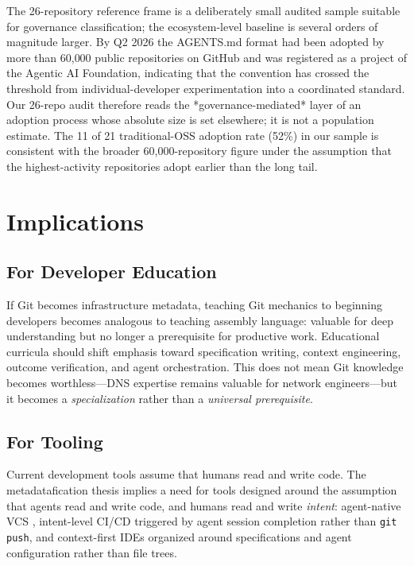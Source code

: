 \documentclass[12pt]{article}
\begin{document}
The 26-repository reference frame is a deliberately small audited sample suitable for governance classification; the ecosystem-level baseline is several orders of magnitude larger. By Q2 2026 the AGENTS.md format had been adopted by more than 60{,}000 public repositories on GitHub and was registered as a project of the Agentic AI Foundation, indicating that the convention has crossed the threshold from individual-developer experimentation into a coordinated standard. Our 26-repo audit therefore reads the *governance-mediated* layer of an adoption process whose absolute size is set elsewhere; it is not a population estimate. The 11 of 21 traditional-OSS adoption rate (52\%) in our sample is consistent with the broader 60{,}000-repository figure under the assumption that the highest-activity repositories adopt earlier than the long tail.

\section{Implications}

\subsection{For Developer Education}

If Git becomes infrastructure metadata, teaching Git mechanics to beginning developers becomes analogous to teaching assembly language: valuable for deep understanding but no longer a prerequisite for productive work. Educational curricula should shift emphasis toward specification writing, context engineering, outcome verification, and agent orchestration. This does not mean Git knowledge becomes worthless---DNS expertise remains valuable for network engineers---but it becomes a \textit{specialization} rather than a \textit{universal prerequisite}.

\subsection{For Tooling}

Current development tools assume that humans read and write code. The metadatafication thesis implies a need for tools designed around the assumption that agents read and write code, and humans read and write \textit{intent}: agent-native VCS \citep{atomic2026, cohen2026manyana}, intent-level CI/CD triggered by agent session completion rather than \texttt{git push}, and context-first IDEs organized around specifications and agent configuration rather than file trees.
\end{document}
